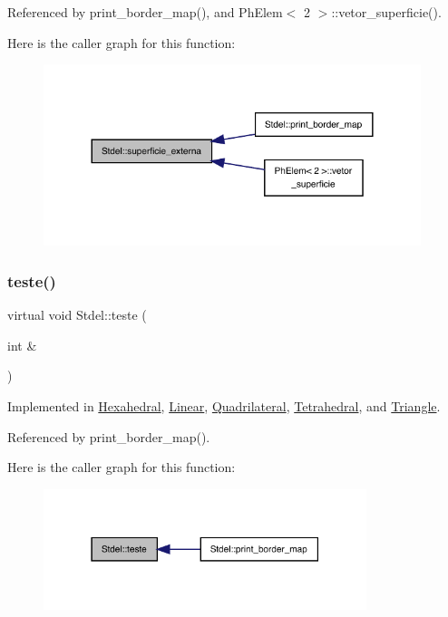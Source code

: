 Referenced by print\+\_\+border\+\_\+map(), and Ph\+Elem$<$ 2 $>$\+::vetor\+\_\+superficie().

Here is the caller graph for this function\+:
\nopagebreak
\begin{figure}[H]
\begin{center}
\leavevmode
\includegraphics[width=312pt]{classStdel_a4e4aa3bbd0299054ec5447bd73efc6a0_icgraph}
\end{center}
\end{figure}
\mbox{\label{classStdel_ae62bc70bb31e48d165593ed1ecd482f8}} 
\subsubsection{\texorpdfstring{teste()}{teste()}}
{\footnotesize\ttfamily virtual void Stdel\+::teste (\begin{DoxyParamCaption}\item[{int \&}]{ }\end{DoxyParamCaption})\hspace{0.3cm}{\ttfamily [pure virtual]}}



Implemented in \hyperlink{classHexahedral_adc767ec026a292f3d434e825779bf51a}{Hexahedral}, \hyperlink{classLinear_a421345769e5a12beb28fb8d146683cf7}{Linear}, \hyperlink{classQuadrilateral_ae960ae1aa7f86570ca6badbfd5801bb3}{Quadrilateral}, \hyperlink{classTetrahedral_acf22ee55ae8a5f17467b1dc4c6da3b51}{Tetrahedral}, and \hyperlink{classTriangle_ab4de79168cc2bf7bf04634681f434610}{Triangle}.



Referenced by print\+\_\+border\+\_\+map().

Here is the caller graph for this function\+:
\nopagebreak
\begin{figure}[H]
\begin{center}
\leavevmode
\includegraphics[width=267pt]{classStdel_ae62bc70bb31e48d165593ed1ecd482f8_icgraph}
\end{center}
\end{figure}
\mbox{\label{classStdel_a75023fc369db2752845a9ce278f10929}} 
